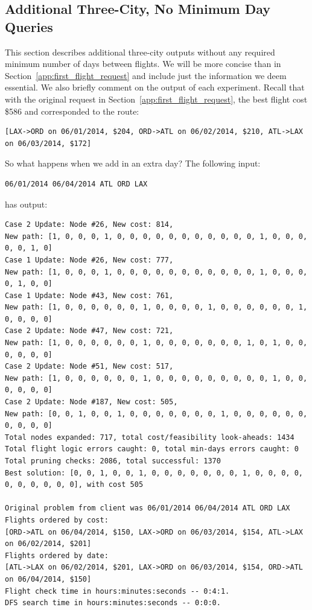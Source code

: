 \documentclass{article}
\begin{document}
\subsection{Additional Three-City, No Minimum Day Queries}\label{app:three_city}

This section describes additional three-city outputs without any required minimum number of days between flights. We will be more concise than in
Section~\ref{app:first_flight_request} and include just the information we deem essential. We also briefly comment on the output of each experiment.
Recall that with the original request in Section~\ref{app:first_flight_request}, the best flight cost \$586 and corresponded to the route:

\footnotesize
\begin{verbatim}
[LAX->ORD on 06/01/2014, $204, ORD->ATL on 06/02/2014, $210, ATL->LAX on 06/03/2014, $172] 
\end{verbatim}
\normalsize

So what happens when we add in an extra day? The following input:

\begin{verbatim}
06/01/2014 06/04/2014 ATL ORD LAX
\end{verbatim}

has output:

\scriptsize
\begin{verbatim}
Case 2 Update: Node #26, New cost: 814, 
New path: [1, 0, 0, 0, 1, 0, 0, 0, 0, 0, 0, 0, 0, 0, 0, 0, 1, 0, 0, 0, 0, 0, 1, 0]
Case 1 Update: Node #26, New cost: 777, 
New path: [1, 0, 0, 0, 1, 0, 0, 0, 0, 0, 0, 0, 0, 0, 0, 0, 1, 0, 0, 0, 0, 1, 0, 0]
Case 1 Update: Node #43, New cost: 761, 
New path: [1, 0, 0, 0, 0, 0, 0, 1, 0, 0, 0, 0, 1, 0, 0, 0, 0, 0, 0, 1, 0, 0, 0, 0]
Case 2 Update: Node #47, New cost: 721, 
New path: [1, 0, 0, 0, 0, 0, 0, 1, 0, 0, 0, 0, 0, 0, 0, 1, 0, 1, 0, 0, 0, 0, 0, 0]
Case 2 Update: Node #51, New cost: 517, 
New path: [1, 0, 0, 0, 0, 0, 0, 1, 0, 0, 0, 0, 0, 0, 0, 0, 0, 1, 0, 0, 0, 0, 0, 0]
Case 2 Update: Node #187, New cost: 505, 
New path: [0, 0, 1, 0, 0, 1, 0, 0, 0, 0, 0, 0, 0, 1, 0, 0, 0, 0, 0, 0, 0, 0, 0, 0]
Total nodes expanded: 717, total cost/feasibility look-aheads: 1434
Total flight logic errors caught: 0, total min-days errors caught: 0
Total pruning checks: 2086, total successful: 1370
Best solution: [0, 0, 1, 0, 0, 1, 0, 0, 0, 0, 0, 0, 0, 1, 0, 0, 0, 0, 0, 0, 0, 0, 0, 0], with cost 505

Original problem from client was 06/01/2014 06/04/2014 ATL ORD LAX
Flights ordered by cost:
[ORD->ATL on 06/04/2014, $150, LAX->ORD on 06/03/2014, $154, ATL->LAX on 06/02/2014, $201]
Flights ordered by date:
[ATL->LAX on 06/02/2014, $201, LAX->ORD on 06/03/2014, $154, ORD->ATL on 06/04/2014, $150]
Flight check time in hours:minutes:seconds -- 0:4:1.
DFS search time in hours:minutes:seconds -- 0:0:0.
\end{verbatim}
\normalsize
\end{document}
